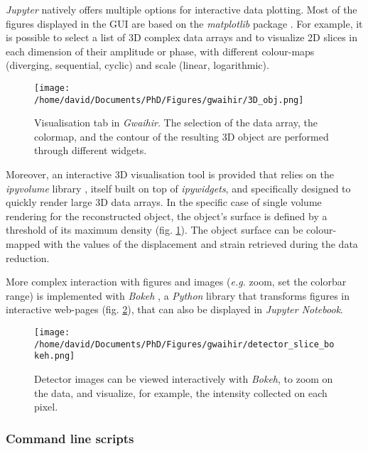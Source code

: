 \textit{Jupyter} natively offers multiple options for interactive data plotting.
Most of the figures displayed in the GUI are based on the \textit{matplotlib} package \parencite{hunter2007matplotlib}.
For example, it is possible to select a list of 3D complex data arrays and to visualize 2D slices in each dimension of their amplitude or phase, with different colour-maps (diverging, sequential, cyclic) and scale (linear, logarithmic).

\begin{figure}[!htb]
    \centering
    \texttt{[image: /home/david/Documents/PhD/Figures/gwaihir/3D\_obj.png]}
    \caption{
    Visualisation tab in \textit{Gwaihir}.
    The selection of the data array, the colormap, and the contour of the resulting 3D object are performed through different widgets.
    }
    \label{fig:3D_object}
\end{figure}

Moreover, an interactive 3D visualisation tool is provided that relies on the \textit{ipyvolume} library \parencite{ipyvolume}, itself built on top of \textit{ipywidgets}, and specifically designed to quickly render large 3D data arrays.
In the specific case of single volume rendering for the reconstructed object, the object's surface is defined by a threshold of its maximum density (fig. \ref{fig:3D_object}).
The object surface can be colour-mapped with the values of the displacement and strain retrieved during the data reduction.

More complex interaction with figures and images (\textit{e.g.} zoom, set the colorbar range) is implemented with \textit{Bokeh} \parencite{Bokeh}, a \textit{Python} library that transforms figures in interactive web-pages (fig. \ref{fig:BokehDetector}), that can also be displayed in \textit{Jupyter Notebook}.

\begin{figure}[!htb]
    \centering
    \texttt{[image: /home/david/Documents/PhD/Figures/gwaihir/detector\_slice\_bokeh.png]}
    \caption{
    Detector images can be viewed interactively with \textit{Bokeh}, to zoom on the data, and visualize, for example, the intensity collected on each pixel.
    }
    \label{fig:BokehDetector}
\end{figure}

\subsubsection{Command line scripts}

